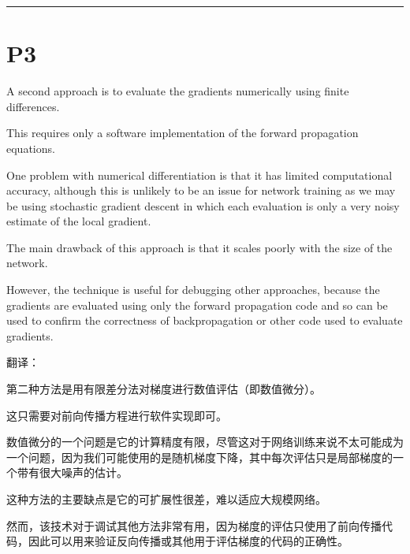 \documentclass{article}
\begin{document}
\noindent\rule{\linewidth}{0.4pt}

\section{P3}

A second approach is to evaluate the gradients numerically using finite differences. 

This requires only a software implementation of the forward propagation equations. 

One problem with numerical differentiation is that it has limited computational accuracy, although this is unlikely to be an issue for network training as we may be using stochastic gradient descent in which each evaluation is only a very noisy estimate of the local gradient. 

The main drawback of this approach is that it scales poorly with the size of the network. 

However, the technique is useful for debugging other approaches, because the gradients are evaluated using only the forward propagation code and so can be used to confirm the correctness of backpropagation or other code used to evaluate gradients.

{\color{red}
翻译：

第二种方法是用有限差分法对梯度进行数值评估（即数值微分）。

这只需要对前向传播方程进行软件实现即可。

数值微分的一个问题是它的计算精度有限，尽管这对于网络训练来说不太可能成为一个问题，因为我们可能使用的是随机梯度下降，其中每次评估只是局部梯度的一个带有很大噪声的估计。

这种方法的主要缺点是它的可扩展性很差，难以适应大规模网络。

然而，该技术对于调试其他方法非常有用，因为梯度的评估只使用了前向传播代码，因此可以用来验证反向传播或其他用于评估梯度的代码的正确性。
}
\end{document}
